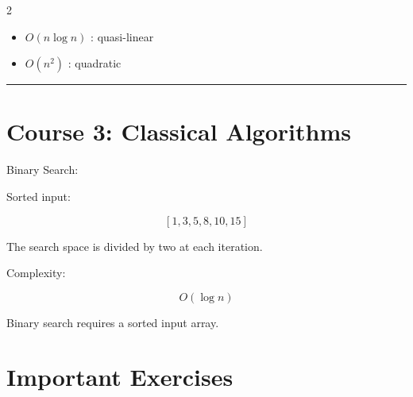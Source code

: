 \documentclass[a4paper,9pt]{extarticle}
\newcommand{\separator}{
\vspace{2pt}
\hrule
\vspace{3pt}
}
\begin{document}
\begin{multicols}{2}
\begin{itemize}
\item $O(n\log n)$ : quasi-linear

\item $O(n^2)$ : quadratic

\end{itemize}



\begin{figurebox}


\end{figurebox}



\separator



\section{Course 3: Classical Algorithms}


\begin{example}

Binary Search:


Sorted input:

\[
[1,3,5,8,10,15]
\]


The search space is divided by two
at each iteration.


Complexity:

\[
O(\log n)
\]


\end{example}



\begin{warning}

Binary search requires
a sorted input array.

\end{warning}



\section{Important Exercises}



\end{multicols}
\end{document}
